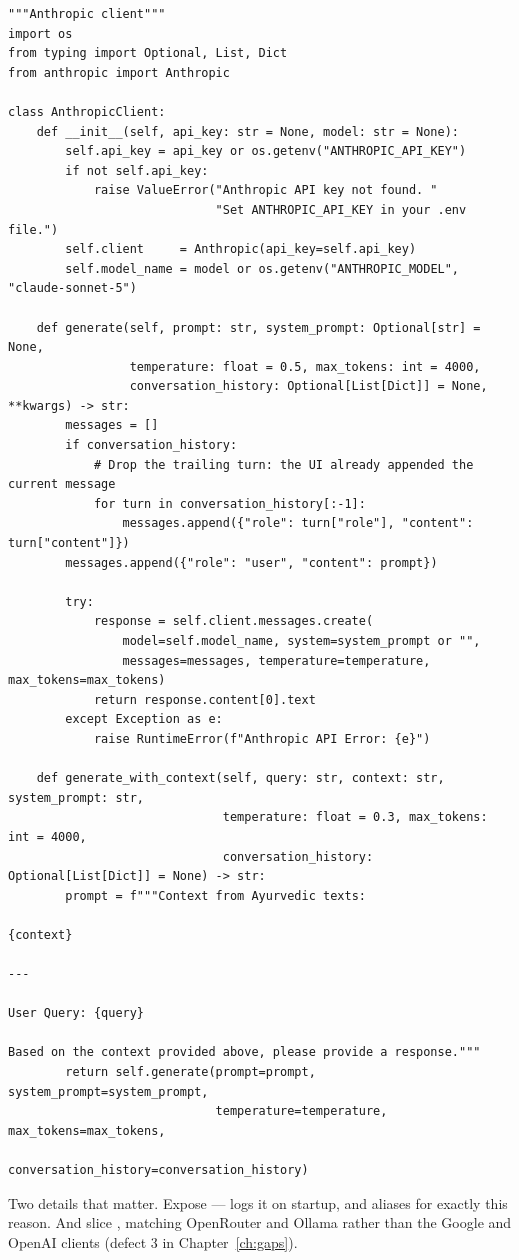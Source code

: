 \begin{lstlisting}[style=py]
"""Anthropic client"""
import os
from typing import Optional, List, Dict
from anthropic import Anthropic

class AnthropicClient:
    def __init__(self, api_key: str = None, model: str = None):
        self.api_key = api_key or os.getenv("ANTHROPIC_API_KEY")
        if not self.api_key:
            raise ValueError("Anthropic API key not found. "
                             "Set ANTHROPIC_API_KEY in your .env file.")
        self.client     = Anthropic(api_key=self.api_key)
        self.model_name = model or os.getenv("ANTHROPIC_MODEL", "claude-sonnet-5")

    def generate(self, prompt: str, system_prompt: Optional[str] = None,
                 temperature: float = 0.5, max_tokens: int = 4000,
                 conversation_history: Optional[List[Dict]] = None, **kwargs) -> str:
        messages = []
        if conversation_history:
            # Drop the trailing turn: the UI already appended the current message
            for turn in conversation_history[:-1]:
                messages.append({"role": turn["role"], "content": turn["content"]})
        messages.append({"role": "user", "content": prompt})

        try:
            response = self.client.messages.create(
                model=self.model_name, system=system_prompt or "",
                messages=messages, temperature=temperature, max_tokens=max_tokens)
            return response.content[0].text
        except Exception as e:
            raise RuntimeError(f"Anthropic API Error: {e}")

    def generate_with_context(self, query: str, context: str, system_prompt: str,
                              temperature: float = 0.3, max_tokens: int = 4000,
                              conversation_history: Optional[List[Dict]] = None) -> str:
        prompt = f"""Context from Ayurvedic texts:

{context}

---

User Query: {query}

Based on the context provided above, please provide a response."""
        return self.generate(prompt=prompt, system_prompt=system_prompt,
                             temperature=temperature, max_tokens=max_tokens,
                             conversation_history=conversation_history)
\end{lstlisting}

Two details that matter. Expose  ---  logs it on startup, and  aliases  for exactly this reason. And slice , matching OpenRouter and Ollama rather than the Google and OpenAI clients (defect 3 in Chapter~\ref{ch:gaps}).

